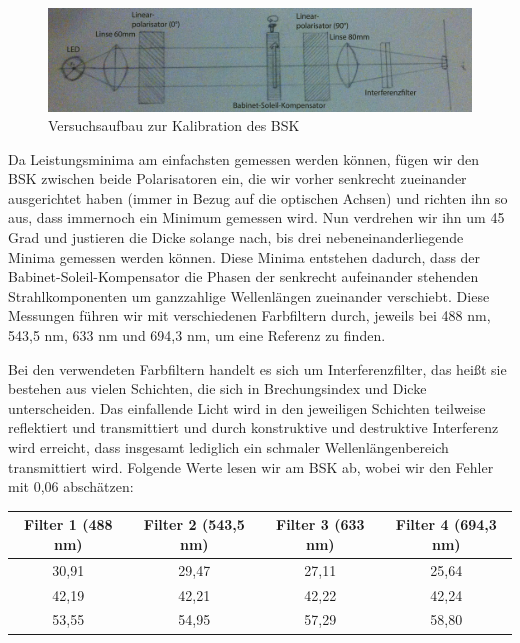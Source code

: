 \documentclass[bigchapter,colorback,accentcolor=tud4b,linedtoc,11pt]{tudreport}
\begin{document}
\begin{figure}[ht!]
\centering
\includegraphics[width=150mm]{img/skizzen/versuch_c_1.jpg}
\caption{Versuchsaufbau zur Kalibration des BSK}
\end{figure}

Da Leistungsminima am einfachsten gemessen werden können, fügen wir den BSK  zwischen beide Polarisatoren ein, die wir vorher senkrecht zueinander ausgerichtet haben (immer in Bezug auf die optischen Achsen) und richten ihn so aus, dass immernoch ein Minimum gemessen wird. Nun verdrehen wir ihn um 45 Grad und justieren die Dicke solange nach, bis drei nebeneinanderliegende Minima gemessen werden können. Diese Minima entstehen dadurch, dass der Babinet-Soleil-Kompensator die Phasen der senkrecht aufeinander stehenden Strahlkomponenten um ganzzahlige Wellenlängen zueinander verschiebt. Diese Messungen führen wir mit verschiedenen Farbfiltern durch, jeweils bei 488 nm, 543,5 nm, 633 nm und 694,3 nm, um eine Referenz zu finden.

Bei den verwendeten Farbfiltern handelt es sich um Interferenzfilter, das heißt sie bestehen aus vielen Schichten, die sich in Brechungsindex und Dicke unterscheiden. Das einfallende Licht wird in den jeweiligen Schichten teilweise reflektiert und transmittiert und durch konstruktive und destruktive Interferenz wird erreicht, dass insgesamt lediglich ein schmaler Wellenlängenbereich transmittiert wird. Folgende Werte lesen wir am BSK ab, wobei wir den Fehler mit 0,06 abschätzen: 


\begin{center}
  \begin{tabular}{|c|c|c|c|}
    \hline
        Filter 1 (488 nm) & Filter 2 (543,5 nm) & Filter 3 (633 nm) & Filter 4 (694,3 nm) \\ \hline
        30,91 & 29,47 & 27,11 & 25,64 \\ \hline
        42,19 & 42,21 & 42,22 & 42,24 \\ \hline
        53,55 & 54,95 & 57,29 & 58,80 \\ \hline
	\end{tabular}
\end{center}
\end{document}

